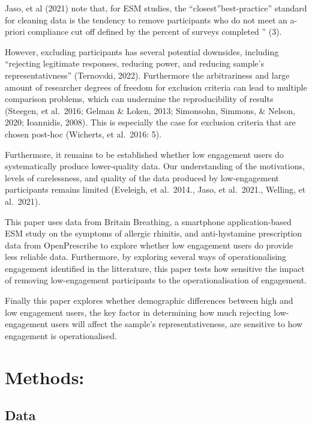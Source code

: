 \documentclass[
]{article}
\begin{document}
Jaso, et al (2021) note that, for ESM studies, the
``closest''best-practice'' standard for cleaning data is the tendency to
remove participants who do not meet an a-priori compliance cut off
defined by the percent of surveys completed '' (3).

However, excluding participants has several potential downsides,
including ``rejecting legitimate responses, reducing power, and reducing
sample's representativness'' (Ternovski, 2022). Furthermore the
arbitrariness and large amount of researcher degrees of freedom for
exclusion criteria can lead to multiple comparison problems, which can
undermine the reproducibility of results (Steegen, et al.~2016; Gelman
\& Loken, 2013; Simonsohn, Simmons, \& Nelson, 2020; Ioannidis, 2008).
This is especially the case for exclusion criteria that are chosen
post-hoc (Wicherts, et al.~2016: 5).

Furthermore, it remains to be established whether low engagement users
do systematically produce lower-quality data. Our understanding of the
motivations, levels of carelessness, and quality of the data produced by
low-engagement participants remains limited (Eveleigh, et al.~2014.,
Jaso, et al.~2021., Welling, et al.~2021).

This paper uses data from Britain Breathing, a smartphone
application-based ESM study on the symptoms of allergic rhinitis, and
anti-hystamine prescription data from OpenPrescribe to explore whether
low engagement users do provide less reliable data. Furthermore, by
exploring several ways of operationalising engagement identified in the
litterature, this paper tests how sensitive the impact of removing
low-engagement participants to the operationalisation of engagement.

Finally this paper explores whether demographic differences between high
and low engagement users, the key factor in determining how much
rejecting low-engagement users will affect the sample's
representativeness, are sensitive to how engagement is operationalised.

\hypertarget{methods}{%
\section{Methods:}\label{methods}}

\hypertarget{data}{%
\subsection{Data}\label{data}}
\end{document}
